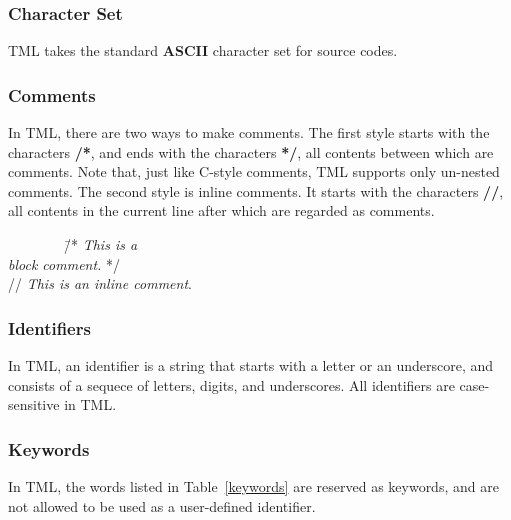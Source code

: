 \documentclass[12pt,psfig,a4]{article}
\begin{document}

\subsubsection{Character Set}
TML takes the standard \textbf{ASCII} character set for source codes.

\subsubsection{Comments}
In TML, there are two ways to make comments. The first style starts with the characters \textbf{/*}, and ends with the characters \textbf{*/}, all contents between which are comments. Note that, just like C-style comments, TML supports only un-nested comments. The second style is inline comments. It starts with the characters \textbf{//}, all contents in the current line after which are regarded as comments.

\begin{code}
\begin{tabbing}
~~~~~~~~\= /*  \=\textit{This is a} \\
\> \> \textit{block comment.} */\\
\> // \textit{This is an inline comment}.
\end{tabbing}
\end{code}

\subsubsection{Identifiers} \label{lexConId}
In TML, an identifier is a string that starts with a letter or an underscore, and consists of a sequece of letters, digits, and underscores. %
All identifiers are case-sensitive in TML.

\subsubsection{Keywords}
In TML, the words listed in Table~\ref{keywords} are reserved as keywords, and are not allowed to be used as a user-defined identifier.
\end{document}
